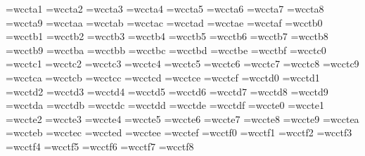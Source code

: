 \font\cfaB=wccta1
\font\cfaC=wccta2
\font\cfaD=wccta3
\font\cfaE=wccta4
\font\cfaF=wccta5
\font\cfaG=wccta6
\font\cfaH=wccta7
\font\cfaI=wccta8
\font\cfaJ=wccta9
\font\cfaa=wcctaa
\font\cfab=wcctab
\font\cfac=wcctac
\font\cfad=wcctad
\font\cfae=wcctae
\font\cfaf=wcctaf
\font\cfbA=wcctb0
\font\cfbB=wcctb1
\font\cfbC=wcctb2
\font\cfbD=wcctb3
\font\cfbE=wcctb4
\font\cfbF=wcctb5
\font\cfbG=wcctb6
\font\cfbH=wcctb7
\font\cfbI=wcctb8
\font\cfbJ=wcctb9
\font\cfba=wcctba
\font\cfbb=wcctbb
\font\cfbc=wcctbc
\font\cfbd=wcctbd
\font\cfbe=wcctbe
\font\cfbf=wcctbf
\font\cfcA=wcctc0
\font\cfcB=wcctc1
\font\cfcC=wcctc2
\font\cfcD=wcctc3
\font\cfcE=wcctc4
\font\cfcF=wcctc5
\font\cfcG=wcctc6
\font\cfcH=wcctc7
\font\cfcI=wcctc8
\font\cfcJ=wcctc9
\font\cfca=wcctca
\font\cfcb=wcctcb
\font\cfcc=wcctcc
\font\cfcd=wcctcd
\font\cfce=wcctce
\font\cfcf=wcctcf
\font\cfdA=wcctd0
\font\cfdB=wcctd1
\font\cfdC=wcctd2
\font\cfdD=wcctd3
\font\cfdE=wcctd4
\font\cfdF=wcctd5
\font\cfdG=wcctd6
\font\cfdH=wcctd7
\font\cfdI=wcctd8
\font\cfdJ=wcctd9
\font\cfda=wcctda
\font\cfdb=wcctdb
\font\cfdc=wcctdc
\font\cfdd=wcctdd
\font\cfde=wcctde
\font\cfdf=wcctdf
\font\cfeA=wccte0
\font\cfeB=wccte1
\font\cfeC=wccte2
\font\cfeD=wccte3
\font\cfeE=wccte4
\font\cfeF=wccte5
\font\cfeG=wccte6
\font\cfeH=wccte7
\font\cfeI=wccte8
\font\cfeJ=wccte9
\font\cfea=wcctea
\font\cfeb=wccteb
\font\cfec=wcctec
\font\cfed=wccted
\font\cfee=wcctee
\font\cfef=wcctef
\font\cffA=wcctf0
\font\cffB=wcctf1
\font\cffC=wcctf2
\font\cffD=wcctf3
\font\cffE=wcctf4
\font\cffF=wcctf5
\font\cffG=wcctf6
\font\cffH=wcctf7
\font\cffI=wcctf8
%
\newif\ifchifontset
\chifontsetfalse %
%
\newif\ifbigC
\bigCfalse %
\def\cglue{\hskip0pt plus.5pt}
\newcount\Cchar
%
\def\cchar#1{\Cchar=#1\ifbigC\advance\Cchar by -128\fi\char\the\Cchar}
\def\chichar#1#2{\ifchifontset\cchar{#1}\restorefont\discretionary{}{}{}\cglue\chifontsetfalse\else\chifontsettrue\edef\restorefont{\the\font}#2\fi}
\def\chichr#1{\ifchifontset\cchar{#1}\restorefont\chifontsetfalse\else\message{!pmC! character #1 out of context!}\fi}
